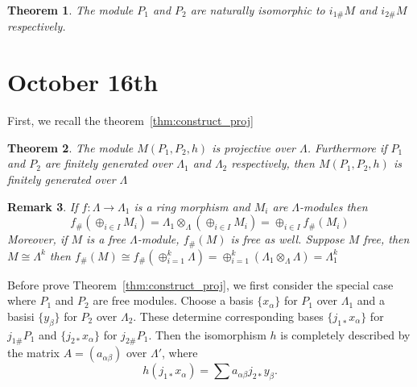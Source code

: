 \documentclass[11pt]{article}
\newtheorem{thm}{Theorem}[section]
\newtheorem{rmk}[thm]{Remark}
\newcommand{\lrta}{\longrightarrow}
\begin{document}
\begin{thm}\label{thm:construct_iso2}
The module $P_1$ and $P_2$ are naturally isomorphic to $i_{1\#} M$ and $i_{2\#} M$ respectively.
\end{thm}

\section{October 16th}
First, we recall the theorem~\ref{thm:construct_proj}
\begin{thm}
The module $M(P_1,P_2,h)$ is projective over $\Lambda$. Furthermore if $P_1$ and $P_2$ are finitely generated over $\Lambda_1$ and $\Lambda_2$ respectively, then $M(P_1,P_2,h)$ is finitely generated over $\Lambda$
\end{thm}
\begin{rmk}
If $f:\Lambda\lrta \Lambda_1$ is a ring morphism and $M_i$ are $\Lambda$-modules then 
$$
f_{\#}\left(\oplus_{i\in I}M_i\right)=\Lambda_1\otimes_\Lambda\left(\oplus_{i\in I}M_i\right)=\oplus_{i\in I} f_{\#}(M_i)
$$
Moreover, if $M $ is a free $\Lambda$-module, $f_\#(M)$ is free as well. Suppose $M$ free, then $M\cong \Lambda^k$ then $f_\#(M)\cong f_\#(\oplus_{i=1}^k  \Lambda)=\oplus_{i=1}^k (\Lambda_1\otimes_\Lambda \Lambda)=\Lambda_1^k$
\end{rmk}

Before prove Theorem~\ref{thm:construct_proj}, we first consider the special case where $P_1$ and $P_2$ are free modules.
Choose a basis $\{x_\alpha\}$ for $P_1$ over $\Lambda_1$ and a basisi $\{y_\beta\}$ for $P_2$ over $\Lambda_2$. These determine corresponding bases $\{j_{1*}x_\alpha\}$ for $j_{1\#}P_1$ and $\{j_{2*}x_\alpha\}$ for $j_{2\#}P_1$. Then the isomorphism $h$ is completely described by the matrix $A=(a_{\alpha\beta})$ over $\Lambda'$, where 
$$
h(j_{1*}x_\alpha)=\sum a_{\alpha\beta}j_{2*}y_\beta
.
$$
\end{document}

